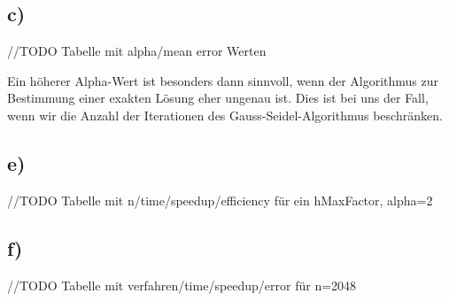 \documentclass[paper = a4]{scrartcl}
\begin{document}
\subsection*{c)}
//TODO Tabelle mit alpha/mean error Werten

Ein höherer Alpha-Wert ist besonders dann sinnvoll, wenn der Algorithmus zur Bestimmung einer exakten Lösung eher ungenau ist. Dies ist bei uns der Fall, wenn wir die Anzahl der Iterationen des Gauss-Seidel-Algorithmus beschränken.

\subsection*{e)}
//TODO Tabelle mit n/time/speedup/efficiency für ein hMaxFactor, alpha=2

\subsection*{f)}
//TODO Tabelle mit verfahren/time/speedup/error für n=2048
\end{document}
